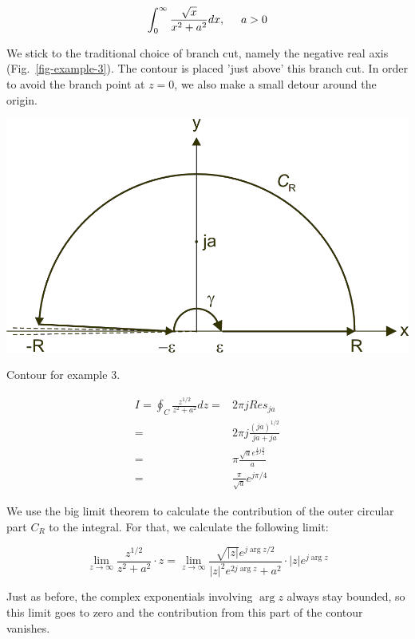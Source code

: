 \begin{equation}
\int_0^{\infty}\frac{\sqrt{x}}{x^2+a^2}dx, \hspace{0.5cm} a > 0
\end{equation}

We stick to the traditional choice of branch cut, namely the negative real axis
(Fig.~\ref{fig-example-3}). The contour is placed 'just above' this branch cut. In order to avoid the branch point at $z=0$, we also make a small detour around the origin.

\begin{marginfigure}
\centering
\includegraphics{complex/figures/int_ex_3}
\caption{Contour for example 3.}
\label{fig-example-3}
\end{marginfigure}

\begin{align}
I = \oint_{{C}} \frac{z^{1/2}}{z^2+a^2} dz =& 2 \pi j Res_{j a}
\nonumber \\
=& 2 \pi j \frac{(j a)^{1/2}}{ja + ja} \nonumber \\
=& \pi \frac{\sqrt{a}e^{\frac{1}{2}j\frac{\pi}{2}}}{a} \nonumber \\
=& \frac{\pi}{\sqrt{a}} e^{j \pi /4}
\end{align}

We use the big limit theorem to calculate the contribution of the outer circular
part ${C_R}$ to the integral. For that, we calculate the following
limit:

\begin{equation}
\lim_{z \to \infty}\frac{z^{1/2}}{z^2+a^2} \cdot z = \lim_{z \to
\infty}\frac{\sqrt{|z|}e^{j \arg z / 2}}{|z|^2 e^{2 j \arg z}+a^2} \cdot |z|
e^{j \arg z}
\end{equation}

Just as before, the complex exponentials involving $\arg z$ always stay bounded,
so this limit goes to zero and the contribution from this part of the contour
vanishes.

